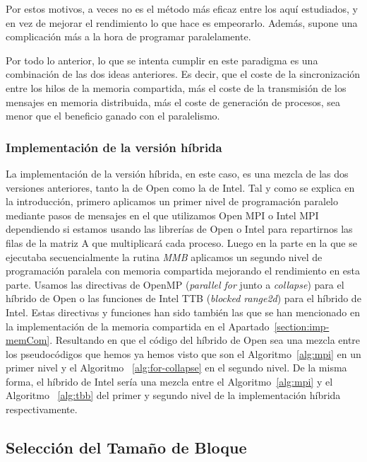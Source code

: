 \documentclass[a4paper,12pt]{article}
\begin{document}
Por estos motivos, a veces no es el método más eficaz entre los aquí estudiados, y en vez de mejorar el rendimiento lo que hace es empeorarlo. Además, supone una complicación más a la hora de programar paralelamente.

Por todo lo anterior, lo que se intenta cumplir en este paradigma es una combinación de las dos ideas anteriores. Es decir, que el coste de la sincronización entre los hilos de la memoria compartida, más el coste de la transmisión de los mensajes en memoria distribuida, más el coste de generación de procesos, sea menor que el beneficio ganado con el paralelismo.

\subsubsection{Implementación de la versión híbrida}

La implementación de la versión híbrida, en este caso, es una mezcla de las dos versiones anteriores, tanto la de Open como la de Intel. Tal y como se explica en la introducción,  primero aplicamos un primer nivel de programación paralelo mediante pasos de mensajes en el que utilizamos Open MPI o Intel MPI dependiendo si estamos usando las librerías de Open o Intel para repartirnos las filas de la matriz A que multiplicará cada proceso. Luego en la parte en la que se ejecutaba secuencialmente la rutina {\it MMB} aplicamos un segundo nivel de programación paralela con memoria compartida mejorando el rendimiento en esta parte. Usamos las directivas de OpenMP ({\it parallel for} junto a {\it collapse}) para el híbrido de Open o las funciones de Intel TTB ({\it blocked range2d}) para el híbrido de Intel. Estas directivas y funciones han sido también las que se han mencionado en la implementación de la memoria compartida en el Apartado~\ref{section:imp-memCom}. Resultando en que el código del híbrido de Open sea una mezcla entre los pseudocódigos que hemos ya hemos visto que son el Algoritmo~\ref{alg:mpi} en un primer nivel y el Algoritmo ~\ref{alg:for-collapse} en el segundo nivel. De la misma forma, el híbrido de Intel sería una mezcla entre el Algoritmo~\ref{alg:mpi} y el Algoritmo ~\ref{alg:tbb} del primer y segundo nivel de la implementación híbrida respectivamente.

\subsection{Selección del Tamaño de Bloque}
\label{section:cache}
\end{document}
